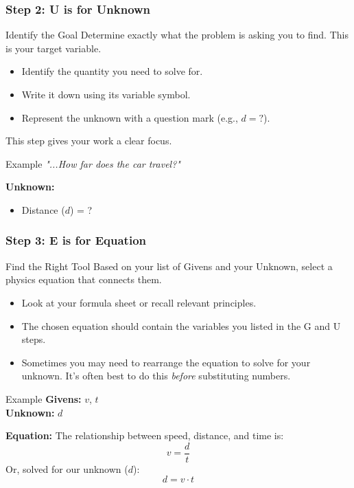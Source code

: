 \documentclass{beamer}
\begin{document}
\begin{frame}[allowframebreaks]
    \frametitle{Step 2: U is for Unknown}
    \begin{block}{Identify the Goal}
        Determine exactly what the problem is asking you to find. This is your target variable.
        \begin{itemize}
            \item Identify the quantity you need to solve for.
            \item Write it down using its variable symbol.
            \item Represent the unknown with a question mark (e.g., $d = ?$).
        \end{itemize}
        This step gives your work a clear focus.
    \end{block}
    \begin{exampleblock}{Example}
        \textit{"...How far does the car travel?"}
        \vspace{1em}
        
        \textbf{Unknown:}
        \begin{itemize}
            \item Distance ($d$) = ?
        \end{itemize}
    \end{exampleblock}
\end{frame}

\begin{frame}[allowframebreaks]
    \frametitle{Step 3: E is for Equation}
    \begin{block}{Find the Right Tool}
        Based on your list of \alert{Givens} and your \alert{Unknown}, select a physics equation that connects them.
        \begin{itemize}
            \item Look at your formula sheet or recall relevant principles.
            \item The chosen equation should contain the variables you listed in the G and U steps.
            \item Sometimes you may need to rearrange the equation to solve for your unknown. It's often best to do this \textit{before} substituting numbers.
        \end{itemize}
    \end{block}
    \begin{exampleblock}{Example}
        \textbf{Givens:} $v$, $t$ \\
        \textbf{Unknown:} $d$
        \vspace{1em}

        \textbf{Equation:}
        The relationship between speed, distance, and time is:
        \[ v = \frac{d}{t} \]
        Or, solved for our unknown ($d$):
        \[ d = v \cdot t \]
    \end{exampleblock}
\end{frame}
\end{document}
